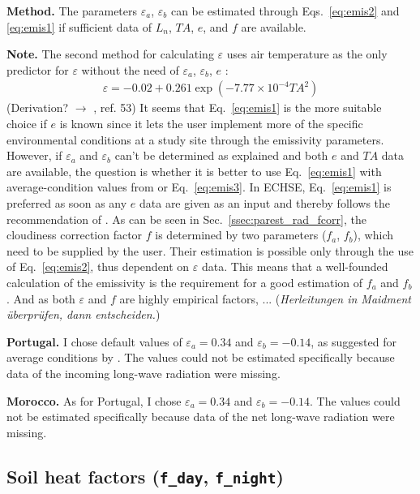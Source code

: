 \documentclass{scrreprt}
\begin{document}
\textbf{Method.}
The parameters $\varepsilon_a$, $\varepsilon_b$ can be estimated through Eqs.~\eqref{eq:emis2} and \eqref{eq:emis1} if sufficient data of $L_n$, $TA$, $e$, and $f$ are available.

\textbf{Note.}
The second method for calculating $\varepsilon$ uses air temperature as the only predictor for $\varepsilon$ without the need of $\varepsilon_a$, $\varepsilon_b$, $e$ \citep{maidment93}:
\begin{align} \label{eq:emis3}
  \varepsilon = -0.02 + 0.261 \exp(-7.77 \times 10^{-4} TA^2)
\end{align}
%
(Derivation? $\rightarrow$ \citet{maidment93}, ref. 53)
It seems that Eq.~\eqref{eq:emis1} is the more suitable choice if $e$ is known since it lets the user implement more of the specific environmental conditions at a study site through the emissivity parameters.
However, if $\varepsilon_a$ and $\varepsilon_b$ can't be determined as explained and both $e$ and $TA$ data are available, the question is whether it is better to use Eq.~\eqref{eq:emis1} with average-condition values from \citet{maidment93} or Eq.~\eqref{eq:emis3}.
In ECHSE, Eq.~\eqref{eq:emis1} is preferred as soon as any $e$ data are given as an input and thereby follows the recommendation of \citet{maidment93}.
As can be seen in Sec.~\ref{ssec:parest_rad_fcorr}, the cloudiness correction factor $f$ is determined by two parameters ($f_a$, $f_b$), which need to be supplied by the user.
Their estimation is possible only through the use of Eq.~\eqref{eq:emis2}, thus dependent on $\varepsilon$ data.
This means that a well-founded calculation of the emissivity is the requirement for a good estimation of $f_a$ and $f_b$.
And as both $\varepsilon$ and $f$ are highly empirical factors, ... (\emph{Herleitungen in Maidment \"uberpr\"ufen, dann entscheiden.})

\textbf{Portugal.}
I chose default values of $\varepsilon_a = 0.34$ and $\varepsilon_b = -0.14$, as suggested for average conditions by \citet{maidment93}.
The values could not be estimated specifically because data of the incoming long-wave radiation were missing.

\textbf{Morocco.}
As for Portugal, I chose $\varepsilon_a = 0.34$ and $\varepsilon_b = -0.14$.
The values could not be estimated specifically because data of the net long-wave radiation were missing.

\subsection{Soil heat factors (\texttt{f\_day}, \texttt{f\_night})} \label{ssec:parest_rad_f}
\end{document}

